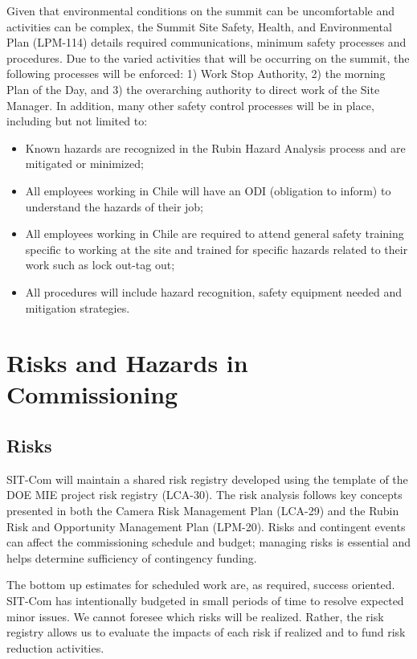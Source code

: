 \documentclass[SE,lsstdraft,authoryear,toc]{lsstdoc}
\begin{document}
Given that environmental conditions on the summit can be uncomfortable and activities can be complex, the Summit Site Safety, Health, and Environmental Plan (LPM-114) details required communications, minimum safety processes and procedures.
Due to the varied activities that will be occurring on the summit, the following processes will be enforced: 1) Work Stop Authority, 2) the morning Plan of the Day, and 3) the overarching authority to direct work of the Site Manager.  In addition, many other safety control processes will be in place, including but not limited to:
\begin{itemize}
    \item Known hazards are recognized in the Rubin Hazard Analysis process and are mitigated or minimized;
    \item All employees working in Chile will have an ODI (obligation to inform) to understand the hazards of their job;
    \item All employees working in Chile are required to attend general safety training specific to working at the site and trained for specific hazards related to their work such as lock out-tag out;
    \item All procedures will include hazard recognition, safety equipment needed and mitigation strategies.
\end{itemize}


\section{Risks and Hazards in Commissioning}
\subsection{Risks}
SIT-Com will maintain a shared risk registry developed using the template of the DOE MIE project risk registry (LCA-30).
The risk analysis follows key concepts presented in both the Camera Risk Management Plan (LCA-29) and the Rubin Risk and Opportunity Management Plan (LPM-20).
Risks and contingent events can affect the commissioning schedule and budget; managing risks is essential and helps determine sufficiency of contingency funding.

The bottom up estimates for scheduled work are, as required, success oriented.
SIT-Com has intentionally budgeted in small periods of time to resolve expected minor issues.
We cannot foresee which risks will be realized.
Rather, the risk registry allows us to evaluate the impacts of each risk if realized and to fund risk reduction activities.
\end{document}
